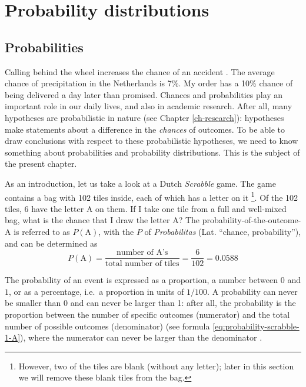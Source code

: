 \documentclass[
]{book}
\begin{document}
\chapter{Probability distributions}\label{ch-probability-distributions}

\section{Probabilities}\label{sec:probabilities}

Calling behind the wheel increases the chance of an accident \citep{Bhar13}.
The average chance of precipitation in the Netherlands is 7\%. My order has a
10\% chance of being delivered a day later than promised. Chances and probabilities
play an important role in our daily lives, and also in academic research. After all,
many hypotheses are probabilistic in nature (see Chapter
\ref{ch-research}): hypotheses make statements about a
difference in the \emph{chances} of outcomes. To be able to draw conclusions with
respect to these probabilistic hypotheses, we need to know something about
probabilities and
probability distributions. This is the subject of the present chapter.

As an introduction, let us take a look at a Dutch \emph{Scrabble} game.
The game contains a bag with 102 tiles inside, each of which has a letter on it
\footnote{However, two of the tiles are blank (without any letter); later in this section we will remove these blank tiles from the bag.}. Of the 102 tiles, 6 have the letter A on them. If I take one tile from a
full and well-mixed bag, what is the chance that I draw the letter A? The
probability-of-the-outcome-A is referred to as \(P(\textrm{A})\), with the \(P\) of
\emph{Probabilitas} (Lat. ``chance, probability''), and can be determined as
\begin{equation}
    P(\textrm{A})=
    \frac{\textrm{number of A's}}{\textrm{total number of tiles}}= 
    \frac{6}{102} = 0.0588
  \label{eq:probability-scrabble-1-A}
\end{equation}

The probability of an event is expressed as a proportion, a number between
\(0\) and \(1\), or as a percentage, i.e.~a proportion in units of \(1/100\).
A probability can never be smaller than \(0\) and can never be larger than
1: after all, the probability is the proportion between the number
of specific outcomes (numerator) and the total number of possible outcomes
(denominator) (see
formula \eqref{eq:probability-scrabble-1-A}), where the numerator can never be larger
than the denominator \citep{SK01}.
\end{document}
